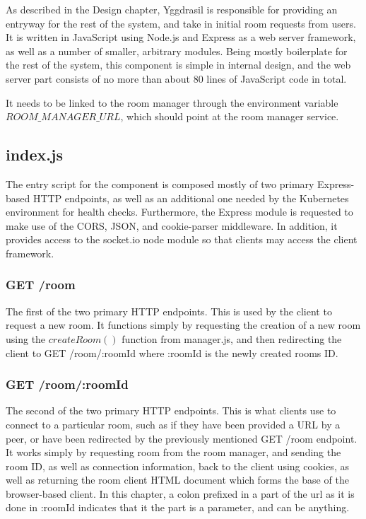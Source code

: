 As described in the Design chapter, Yggdrasil is responsible for providing an entryway for the rest of the system, and take in initial room requests from users. It is written in JavaScript using Node.js and Express as a web server framework, as well as a number of smaller, arbitrary modules. Being mostly boilerplate for the rest of the system, this component is simple in internal design, and the web server part consists of no more than about 80 lines of JavaScript code in total.

It needs to be linked to the room manager through the environment variable\newline$ROOM\_MANAGER\_URL$, which should point at the room manager service.

\subsection{index.js}

The entry script for the component is composed mostly of two primary Express-based HTTP endpoints, as well as an additional one needed by the Kubernetes environment for health checks. Furthermore, the Express module is requested to make use of the CORS, JSON, and cookie-parser middleware. In addition, it provides access to the socket.io node module so that clients may access the client framework.

\subsubsection{GET /room}

The first of the two primary HTTP endpoints. This is used by the client to request a new room. It functions simply by requesting the creation of a new room using the $createRoom()$ function from manager.js, and then redirecting the client to GET /room/:roomId where :roomId is the newly created rooms ID.

\subsubsection{GET /room/:roomId}

The second of the two primary HTTP endpoints. This is what clients use to connect to a particular room, such as if they have been provided a URL by a peer, or have been redirected by the previously mentioned GET /room endpoint. It works simply by requesting room from the room manager, and sending the room ID, as well as connection information, back to the client using cookies, as well as returning the room client HTML document which forms the base of the browser-based client. In this chapter, a colon prefixed in a part of the url as it is done in :roomId indicates that it the part is a parameter, and can be anything.

